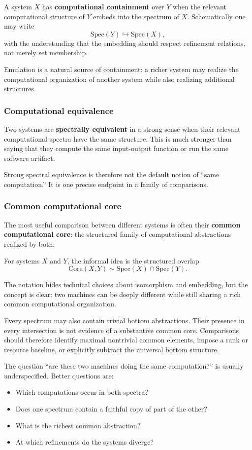 \documentclass[11pt,a4paper]{article}
\begin{document}
A system $X$ has \textbf{computational containment} over $Y$ when the relevant computational structure of $Y$ embeds into the spectrum of $X$. Schematically one may write
\[
\mathrm{Spec}(Y) \hookrightarrow \mathrm{Spec}(X),
\]
with the understanding that the embedding should respect refinement relations, not merely set membership.

Emulation is a natural source of containment: a richer system may realize the computational organization of another system while also realizing additional structures.

\subsubsection{Computational equivalence}

Two systems are \textbf{spectrally equivalent} in a strong sense when their relevant computational spectra have the same structure. This is much stronger than saying that they compute the same input-output function or run the same software artifact.

Strong spectral equivalence is therefore not the default notion of ``same computation.'' It is one precise endpoint in a family of comparisons.

\subsubsection{Common computational core}

The most useful comparison between different systems is often their \textbf{common computational core}: the structured family of computational abstractions realized by both.

For systems $X$ and $Y$, the informal idea is the structured overlap
\[
\mathrm{Core}(X,Y) \sim \mathrm{Spec}(X) \cap \mathrm{Spec}(Y).
\]

The notation hides technical choices about isomorphism and embedding, but the concept is clear: two machines can be deeply different while still sharing a rich common computational organization.

Every spectrum may also contain trivial bottom abstractions. Their presence in every intersection is not evidence of a substantive common core. Comparisons should therefore identify maximal nontrivial common elements, impose a rank or resource baseline, or explicitly subtract the universal bottom structure.

\begin{takeawaybox}
The question ``are these two machines doing the same computation?'' is usually underspecified. Better questions are:
\begin{itemize}
  \item Which computations occur in both spectra?
  \item Does one spectrum contain a faithful copy of part of the other?
  \item What is the richest common abstraction?
  \item At which refinements do the systems diverge?
\end{itemize}
\end{takeawaybox}
\end{document}
